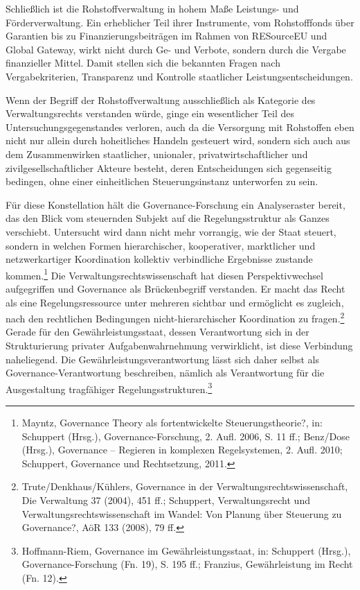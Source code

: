 \documentclass[12pt,a4paper,oneside]{book} %
\begin{document}
{	Schließlich ist die Rohstoffverwaltung in hohem Maße Leistungs- und Förderverwaltung. Ein erheblicher Teil ihrer Instrumente, vom Rohstofffonds über Garantien bis zu Finanzierungsbeiträgen im Rahmen von RESourceEU und Global Gateway, wirkt nicht durch Ge- und Verbote, sondern durch die Vergabe finanzieller Mittel. Damit stellen sich die bekannten Fragen nach Vergabekriterien, Transparenz und Kontrolle staatlicher Leistungsentscheidungen.
	
	Wenn der Begriff der Rohstoffverwaltung ausschließlich als Kategorie des Verwaltungsrechts verstanden würde, ginge ein wesentlicher Teil des Untersuchungsgegenstandes verloren, auch da die Versorgung mit Rohstoffen eben nicht nur allein durch hoheitliches Handeln gesteuert wird, sondern sich auch aus dem Zusammenwirken staatlicher, unionaler, privatwirtschaftlicher und zivilgesellschaftlicher Akteure besteht, deren Entscheidungen sich gegenseitig bedingen, ohne einer einheitlichen Steuerungsinstanz unterworfen zu sein.
	
	Für diese Konstellation hält die Governance-Forschung ein Analyseraster bereit, das den Blick vom steuernden Subjekt auf die Regelungsstruktur als Ganzes verschiebt. Untersucht wird dann nicht mehr vorrangig, wie der Staat steuert, sondern in welchen Formen hierarchischer, kooperativer, marktlicher und netzwerkartiger Koordination kollektiv verbindliche Ergebnisse zustande kommen.\footnote{Mayntz, Governance Theory als fortentwickelte Steuerungstheorie?, in: Schuppert (Hrsg.), Governance-Forschung, 2. Aufl. 2006, S. 11 ff.; Benz/Dose (Hrsg.), Governance – Regieren in komplexen Regelsystemen, 2. Aufl. 2010; Schuppert, Governance und Rechtsetzung, 2011.} Die Verwaltungsrechtswissenschaft hat diesen Perspektivwechsel aufgegriffen und Governance als Brückenbegriff verstanden. Er macht das Recht als eine Regelungsressource unter mehreren sichtbar und ermöglicht es zugleich, nach den rechtlichen Bedingungen nicht-hierarchischer Koordination zu fragen.\footnote{Trute/Denkhaus/Kühlers, Governance in der Verwaltungsrechtswissenschaft, Die Verwaltung 37 (2004), 451 ff.; Schuppert, Verwaltungsrecht und Verwaltungsrechtswissenschaft im Wandel: Von Planung über Steuerung zu Governance?, AöR 133 (2008), 79 ff.} Gerade für den Gewährleistungsstaat, dessen Verantwortung sich in der Strukturierung privater Aufgabenwahrnehmung verwirklicht, ist diese Verbindung naheliegend. Die Gewährleistungsverantwortung lässt sich daher selbst als Governance-Verantwortung beschreiben, nämlich als Verantwortung für die Ausgestaltung tragfähiger Regelungsstrukturen.\footnote{Hoffmann-Riem, Governance im Gewährleistungsstaat, in: Schuppert (Hrsg.), Governance-Forschung (Fn. 19), S. 195 ff.; Franzius, Gewährleistung im Recht (Fn. 12).}
	
}
\end{document}
